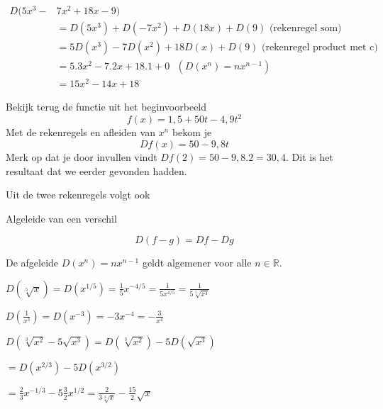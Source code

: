 \begin{voorbeeld}
	\begin{equation*}
	\begin{split}
	D(5x^3-&7x^2+18x-9)\\
	&=D(5x^3)+D(-7x^2)+D(18x)+D(9) \text{ (rekenregel som)}\\
	&=5D(x^3)-7D(x^2)+18D(x)+D(9) \text{ (rekenregel product met c)}\\
	&=5.3x^2-7.2x+18.1+0 \text{ $(D(x^n)=nx^{n-1})$}\\
	&=15x^2-14x+18
	\end{split}
	\end{equation*}
\end{voorbeeld}

\begin{voorbeeld}
	Bekijk terug de functie uit het beginvoorbeeld
	\[
	f(x)=1,5+50t-4,9t^2
	\]
	Met de rekenregels en afleiden van $x^n$ bekom je
	\[
	Df(x)=50-9,8t
	\]
	Merk op dat je door invullen vindt $Df(2)=50-9,8.2=30,4$.
	Dit is het resultaat dat we eerder gevonden hadden.
\end{voorbeeld}

Uit de twee rekenregels volgt ook
\begin{eigenschap} Algeleide van een verschil
	
\[D(f-g)=Df-Dg\]
\end{eigenschap}\vspace{5 mm}
\begin{eigenschap}
	De afgeleide $D(x^n)=nx^{n-1}$ geldt algemener voor alle $n\in \mathbb{R}$.
\end{eigenschap}

\begin{voorbeeld}
	$D(\sqrt[5]{x})=D(x^{1/5})=\frac{1}{5}x^{-4/5}=\frac{1}{5x^{4/5}}=\frac{1}{5\sqrt[5]{x^4}}$
\end{voorbeeld}

\begin{voorbeeld}
	$D(\frac{1}{x^3})=D(x^{-3})=-3x^{-4}=-\frac{3}{x^4}$
\end{voorbeeld}

\begin{voorbeeld}
	$D(\sqrt[3]{x^2}-5\sqrt{x^3})=D(\sqrt[3]{x^2})-5D(\sqrt{x^3})$
	
	\hspace{5mm} $=D(x^{2/3})-5D(x^{3/2})$
	
	\hspace{5mm} $=\frac{2}{3}x^{-1/3}-5\frac{3}{2}x^{1/2}=\frac{2}{3\sqrt[3]{x}}-\frac{15}{2}\sqrt{x}$
\end{voorbeeld}

